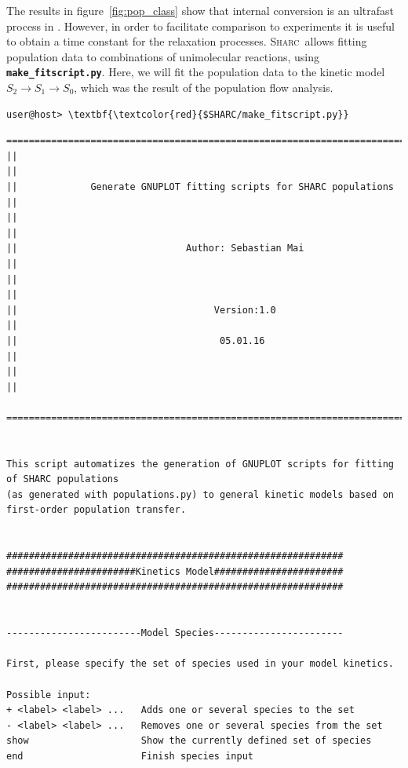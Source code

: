 \documentclass[a4paper,11pt,DIV=15,openany]{scrbook}
\newcommand{\sharc}{\textsc{Sharc}}
\newcommand{\ttt}[1]{\textbf{\texttt{#1}}}
\begin{document}
The results in figure~\ref{fig:pop_class} show that internal conversion is an ultrafast process in .
However, in order to facilitate comparison to experiments it is useful to obtain a time constant for the relaxation processes.
\sharc\ allows fitting population data to combinations of unimolecular reactions, using \ttt{make\_fitscript.py}.
Here, we will fit the population data to the kinetic model $S_2\rightarrow S_1 \rightarrow S_0$, which was the result of the population flow analysis.
\begin{Verbatim}[commandchars=\\\{\}]
user@host> \textbf{\textcolor{red}{$SHARC/make_fitscript.py}}
\end{Verbatim}

\begin{oframed}
\footnotesize\begin{Verbatim}[commandchars=\\\{\}]
  ================================================================================
||                                                                                ||
||             Generate GNUPLOT fitting scripts for SHARC populations             ||
||                                                                                ||
||                              Author: Sebastian Mai                             ||
||                                                                                ||
||                                   Version:1.0                                  ||
||                                    05.01.16                                    ||
||                                                                                ||
  ================================================================================


This script automatizes the generation of GNUPLOT scripts for fitting of SHARC populations 
(as generated with populations.py) to general kinetic models based on first-order population transfer.


############################################################
#######################Kinetics Model#######################
############################################################


------------------------Model Species-----------------------

First, please specify the set of species used in your model kinetics.

Possible input:
+ <label> <label> ...   Adds one or several species to the set
- <label> <label> ...   Removes one or several species from the set
show                    Show the currently defined set of species
end                     Finish species input


\end{Verbatim}
\end{oframed}
\end{document}

